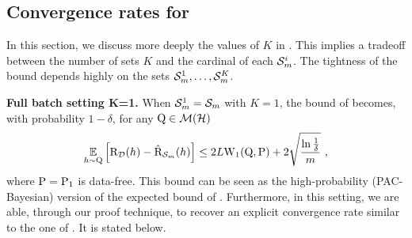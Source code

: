 \begin{noaddcontents}
    \subsection{Convergence rates for }
    \label{sec:discussion-supervised-nnl}
    
    In this section, we discuss more deeply the values of $K$ in . 
    This implies a tradeoff between the number of sets $K$ and the cardinal of each $\Sm^{i}$.
    The tightness of the bound depends highly on the sets $\Sm^1, \dots, \Sm^K$.
    
    \textbf{Full batch setting K=1.} When $\Sm^1=\Sm$ with $K=1$, the bound of  becomes, with probability $1-\delta$, for any $\Q\in\Mcal(\H)$
    \begin{align*}
     \EE_{h\sim\Q}\Big[ \Risk_{\D}(h) - \Riskhat_{\Sm}(h) \Big] \le 2L\W_{1}(\Q, \P) + 2\sqrt{\frac{\ln\frac{1}{\delta}}{m}}\ ,
    \end{align*}
    where $\P=\P_1$ is data-free.
    This bound can be seen as the high-probability (PAC-Bayesian) version of the expected bound of \cite{wang2019information}.
    Furthermore, in this setting, we are able, through our proof technique, to recover an explicit convergence rate similar to the one of \cite[][Theorem 12]{amit2022integral}. It is stated below.
    

\end{noaddcontents}
